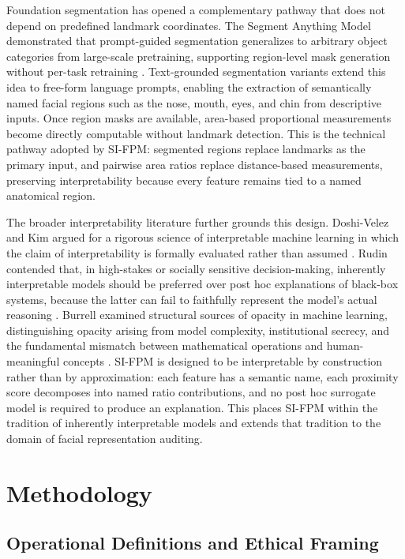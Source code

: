 \documentclass{article}
\begin{document}
Foundation segmentation has opened a complementary pathway that does not depend on predefined landmark coordinates. The Segment Anything Model demonstrated that prompt-guided segmentation generalizes to arbitrary object categories from large-scale pretraining, supporting region-level mask generation without per-task retraining \cite{kirillov2023segment}. Text-grounded segmentation variants extend this idea to free-form language prompts, enabling the extraction of semantically named facial regions such as the nose, mouth, eyes, and chin from descriptive inputs. Once region masks are available, area-based proportional measurements become directly computable without landmark detection. This is the technical pathway adopted by SI-FPM: segmented regions replace landmarks as the primary input, and pairwise area ratios replace distance-based measurements, preserving interpretability because every feature remains tied to a named anatomical region.

The broader interpretability literature further grounds this design. Doshi-Velez and Kim argued for a rigorous science of interpretable machine learning in which the claim of interpretability is formally evaluated rather than assumed \cite{doshivelez2017rigorousscienceinterpretablemachine}. Rudin contended that, in high-stakes or socially sensitive decision-making, inherently interpretable models should be preferred over post hoc explanations of black-box systems, because the latter can fail to faithfully represent the model's actual reasoning \cite{rudin2019stop}. Burrell examined structural sources of opacity in machine learning, distinguishing opacity arising from model complexity, institutional secrecy, and the fundamental mismatch between mathematical operations and human-meaningful concepts \cite{burrell2016machine}. SI-FPM is designed to be interpretable by construction rather than by approximation: each feature has a semantic name, each proximity score decomposes into named ratio contributions, and no post hoc surrogate model is required to produce an explanation. This places SI-FPM within the tradition of inherently interpretable models \cite{rudin2019stop} and extends that tradition to the domain of facial representation auditing.


\section{Methodology}
\label{methodology}

\subsection{Operational Definitions and Ethical Framing}
\label{operational_definitions}
\end{document}
